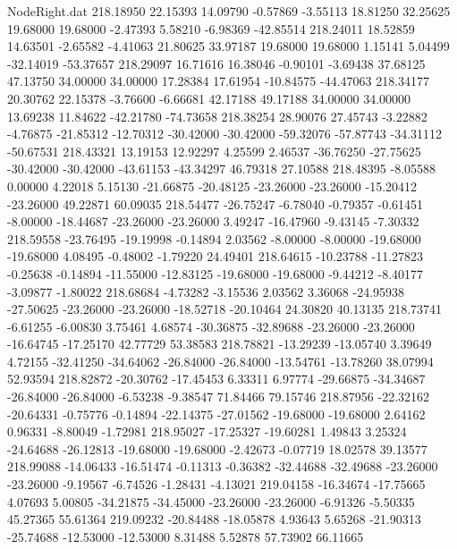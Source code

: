 \begin{filecontents}{NodeRight.dat}
 218.18950   22.15393   14.09790    -0.57869   -3.55113   18.81250   32.25625   19.68000   19.68000   -2.47393    5.58210   -6.98369  -42.85514
 218.24011   18.52859   14.63501    -2.65582   -4.41063   21.80625   33.97187   19.68000   19.68000    1.15141    5.04499  -32.14019  -53.37657
 218.29097   16.71616   16.38046    -0.90101   -3.69438   37.68125   47.13750   34.00000   34.00000   17.28384   17.61954  -10.84575  -44.47063
 218.34177   20.30762   22.15378    -3.76600   -6.66681   42.17188   49.17188   34.00000   34.00000   13.69238   11.84622  -42.21780  -74.73658
 218.38254   28.90076   27.45743    -3.22882   -4.76875  -21.85312  -12.70312  -30.42000  -30.42000  -59.32076  -57.87743  -34.31112  -50.67531
 218.43321   13.19153   12.92297     4.25599    2.46537  -36.76250  -27.75625  -30.42000  -30.42000  -43.61153  -43.34297   46.79318   27.10588
 218.48395   -8.05588    0.00000     4.22018    5.15130  -21.66875  -20.48125  -23.26000  -23.26000  -15.20412  -23.26000   49.22871   60.09035
 218.54477  -26.75247   -6.78040    -0.79357   -0.61451   -8.00000  -18.44687  -23.26000  -23.26000    3.49247  -16.47960   -9.43145   -7.30332
 218.59558  -23.76495  -19.19998    -0.14894    2.03562   -8.00000   -8.00000  -19.68000  -19.68000    4.08495   -0.48002   -1.79220   24.49401
 218.64615  -10.23788  -11.27823    -0.25638   -0.14894  -11.55000  -12.83125  -19.68000  -19.68000   -9.44212   -8.40177   -3.09877   -1.80022
 218.68684   -4.73282   -3.15536     2.03562    3.36068  -24.95938  -27.50625  -23.26000  -23.26000  -18.52718  -20.10464   24.30820   40.13135
 218.73741   -6.61255   -6.00830     3.75461    4.68574  -30.36875  -32.89688  -23.26000  -23.26000  -16.64745  -17.25170   42.77729   53.38583
 218.78821  -13.29239  -13.05740     3.39649    4.72155  -32.41250  -34.64062  -26.84000  -26.84000  -13.54761  -13.78260   38.07994   52.93594
 218.82872  -20.30762  -17.45453     6.33311    6.97774  -29.66875  -34.34687  -26.84000  -26.84000   -6.53238   -9.38547   71.84466   79.15746
 218.87956  -22.32162  -20.64331    -0.75776   -0.14894  -22.14375  -27.01562  -19.68000  -19.68000    2.64162    0.96331   -8.80049   -1.72981
 218.95027  -17.25327  -19.60281     1.49843    3.25324  -24.64688  -26.12813  -19.68000  -19.68000   -2.42673   -0.07719   18.02578   39.13577
 218.99088  -14.06433  -16.51474    -0.11313   -0.36382  -32.44688  -32.49688  -23.26000  -23.26000   -9.19567   -6.74526   -1.28431   -4.13021
 219.04158  -16.34674  -17.75665     4.07693    5.00805  -34.21875  -34.45000  -23.26000  -23.26000   -6.91326   -5.50335   45.27365   55.61364
 219.09232  -20.84488  -18.05878     4.93643    5.65268  -21.90313  -25.74688  -12.53000  -12.53000    8.31488    5.52878   57.73902   66.11665

\end{filecontents}
